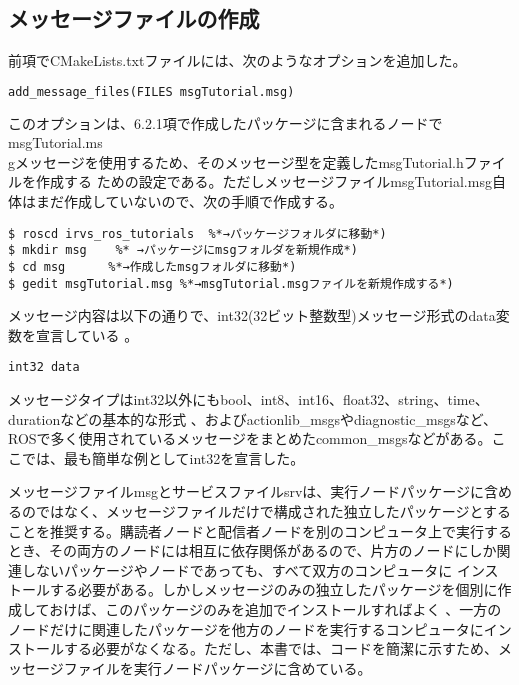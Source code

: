 \subsection{メッセージファイルの作成}

前項でCMakeLists.txtファイルには、次のようなオプションを追加した。

\begin{lstlisting}[language=make]
add_message_files(FILES msgTutorial.msg)
\end{lstlisting}

このオプションは、6.2.1項で作成したパッケージに含まれるノードでmsgTutorial.ms\\gメッセージを使用するため、そのメッセージ型を定義したmsgTutorial.hファイルを作成する ための設定である。ただしメッセージファイルmsgTutorial.msg自体はまだ作成していないので、次の手順で作成する。

\begin{lstlisting}[language=ROS]
$ roscd irvs_ros_tutorials  %*→パッケージフォルダに移動*)
$ mkdir msg    %* →パッケージにmsgフォルダを新規作成*)
$ cd msg      %*→作成したmsgフォルダに移動*)
$ gedit msgTutorial.msg %*→msgTutorial.msgファイルを新規作成する*)
\end{lstlisting}

メッセージ内容は以下の通りで、int32(32ビット整数型)メッセージ形式のdata変数を宣言している  。

\begin{lstlisting}[language=ROS]
int32 data
\end{lstlisting}

メッセージタイプはint32以外にもbool、int8、int16、float32、string、time、durationなどの基本的な形式   、およびactionlib\_msgsやdiagnostic\_msgsなど、ROSで多く使用されているメッセージをまとめたcommon\_msgsなどがある。ここでは、最も簡単な例としてint32を宣言した。

\begin{exercise}
メッセージファイルmsgとサービスファイルsrvは、実行ノードパッケージに含めるのではなく、メッセージファイルだけで構成された独立したパッケージとすることを推奨する。購読者ノードと配信者ノードを別のコンピュータ上で実行するとき、その両方のノードには相互に依存関係があるので、片方のノードにしか関連しないパッケージやノードであっても、すべて双方のコンピュータに  インストールする必要がある。しかしメッセージのみの独立したパッケージを個別に作成しておけば、このパッケージのみを追加でインストールすればよく    、一方のノードだけに関連したパッケージを他方のノードを実行するコンピュータにインストールする必要がなくなる。ただし、本書では、コードを簡潔に示すため、メッセージファイルを実行ノードパッケージに含めている。
\end{exercise}

